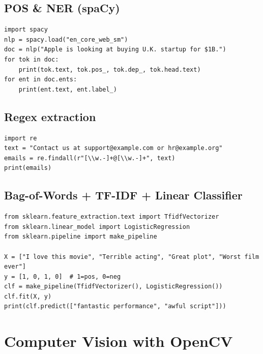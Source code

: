 \subsection*{POS \& NER (spaCy)}
\begin{lstlisting}
import spacy
nlp = spacy.load("en_core_web_sm")
doc = nlp("Apple is looking at buying U.K. startup for $1B.")
for tok in doc:
    print(tok.text, tok.pos_, tok.dep_, tok.head.text)
for ent in doc.ents:
    print(ent.text, ent.label_)
\end{lstlisting}

\subsection*{Regex extraction}
\begin{lstlisting}
import re
text = "Contact us at support@example.com or hr@example.org"
emails = re.findall(r"[\\w.-]+@[\\w.-]+", text)
print(emails)
\end{lstlisting}

\subsection*{Bag-of-Words + TF-IDF + Linear Classifier}
\begin{lstlisting}
from sklearn.feature_extraction.text import TfidfVectorizer
from sklearn.linear_model import LogisticRegression
from sklearn.pipeline import make_pipeline

X = ["I love this movie", "Terrible acting", "Great plot", "Worst film ever"]
y = [1, 0, 1, 0]  # 1=pos, 0=neg
clf = make_pipeline(TfidfVectorizer(), LogisticRegression())
clf.fit(X, y)
print(clf.predict(["fantastic performance", "awful script"]))
\end{lstlisting}

\section{Computer Vision with OpenCV}

